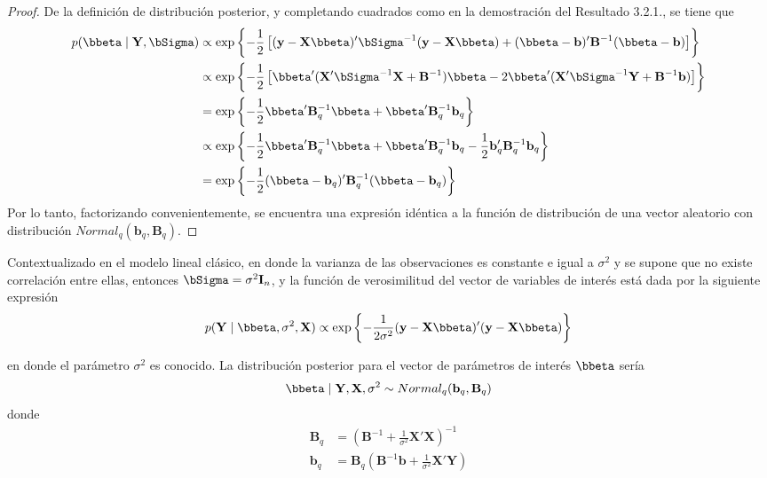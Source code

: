 \begin{proof}
De la definición de distribución posterior, y completando cuadrados como en la demostración del Resultado 3.2.1.,  se tiene que
\begin{align*}
p(\bbeta \mid \mathbf{Y},\bSigma)&\propto
\exp\left\{-\frac{1}{2}\left[(\mathbf{y}-\mathbf{X}\bbeta)'\bSigma^{-1}(\mathbf{y}-\mathbf{X}\bbeta)
+(\bbeta-\mathbf{b})'\mathbf{B}^{-1}(\bbeta-\mathbf{b})\right]\right\}\\
&\propto
\exp\left\{-\frac{1}{2}\left[\bbeta'(\mathbf{X}'\bSigma^{-1}\mathbf{X}+\mathbf{B}^{-1})\bbeta
- 2\bbeta'(\mathbf{X}'\bSigma^{-1}\mathbf{Y}+\mathbf{B}^{-1}\mathbf{b})\right]\right\}\\
&=\exp\left\{-\frac{1}{2}\bbeta'\mathbf{B}^{-1}_q\bbeta
+ \bbeta'\mathbf{B}^{-1}_q\mathbf{b}_q\right\}\\
&\propto\exp\left\{-\frac{1}{2}\bbeta'\mathbf{B}^{-1}_q\bbeta
+ \bbeta'\mathbf{B}^{-1}_q\mathbf{b}_q
-\frac{1}{2}\mathbf{b}_q'\mathbf{B}^{-1}_q\mathbf{b}_q\right\}\\
&=\exp\left\{-\frac{1}{2}(\bbeta-\mathbf{b}_q)'\mathbf{B}^{-1}_q(\bbeta-\mathbf{b}_q)\right\}
\end{align*}
Por lo tanto, factorizando convenientemente, se encuentra una expresión idéntica a la
función de distribución de una vector aleatorio con distribución $Normal_q(\mathbf{b}_q,\mathbf{B}_q)$.
\end{proof}

Contextualizado en el modelo lineal clásico, en donde la varianza de las observaciones es constante e igual a $\sigma^2$ y se supone que no existe correlación entre ellas, entonces $\bSigma=\sigma^2\mathbf{I}_n$, y la función de verosimilitud del vector de variables de interés está dada por la siguiente expresión
\begin{equation}
p(\mathbf{Y} \mid \bbeta,\sigma^2,\mathbf{X})\propto \exp\left\{-\frac{1}{2\sigma^2}(\mathbf{y}-\mathbf{X}\bbeta)'(\mathbf{y}-\mathbf{X}\bbeta)\right\}
\end{equation}

en donde el parámetro $\sigma^2$ es conocido. La distribución posterior para el vector de parámetros de interés $\bbeta$ sería
\begin{equation*}
\bbeta \mid \mathbf{Y},\mathbf{X},\sigma^2 \sim Normal_q(\mathbf{b}_q,\mathbf{B}_q)
\end{equation*}
donde
\begin{align*}
\mathbf{B}_q &= \left(\mathbf{B}^{-1}+\frac{1}{\sigma^2}\mathbf{X}'\mathbf{X}\right)^{-1}\\
\mathbf{b}_q &=\mathbf{B}_q\left(\mathbf{B}^{-1}\mathbf{b}+\frac{1}{\sigma^2}\mathbf{X}'\mathbf{Y}\right)
\end{align*}


